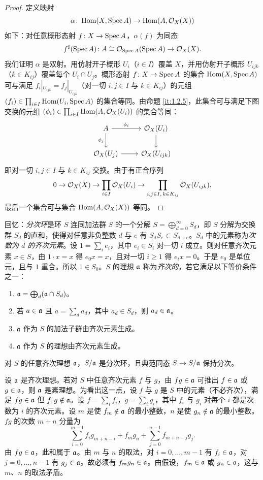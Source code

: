 \begin{proof}
定义映射
\[
\alpha\colon\operatorname{Hom}(X,\operatorname{Spec} A)\to\operatorname{Hom}(A,\mathcal{O}_X(X))
\]
如下：对任意概形态射 $f\colon X\to\operatorname{Spec} A$，$\alpha(f)$ 为同态
\[
f^\sharp(\operatorname{Spec} A)\colon A\cong\mathcal{O}_{\operatorname{Spec} A}(\operatorname{Spec} A)\to\mathcal{O}_X(X).
\]
我们证明 $\alpha$ 是双射。用仿射开子概形 $U_i$（$i\in I$）覆盖 $X$，并用仿射开子概形 $U_{ijk}$（$k\in K_{ij}$）覆盖每个 $U_i\cap U_j$。概形态射 $f\colon X\to\operatorname{Spec} A$ 的集合 $\operatorname{Hom}(X,\operatorname{Spec} A)$ 可与满足 $f_i|_{U_{ijk}}=f_j|_{U_{ijk}}$（对一切 $i,j\in I$ 与 $k\in K_{ij}$）的元组 $(f_i)\in\prod_{i\in I}\operatorname{Hom}(U_i,\operatorname{Spec} A)$ 的集合等同。由命题 \ref{it:1.2.5}，此集合可与满足下图交换的元组 $(\phi_i)\in\prod_{i\in I}\operatorname{Hom}(A,\mathcal{O}_X(U_i))$ 的集合等同：
\[
\begin{tikzcd}
A \arrow[r,"\phi_i"] \arrow[d,"\phi_j"'] & \cO_X(U_i) \arrow[d] \\
\cO_X(U_j) \arrow[r] & \cO_X(U_{ijk})
\end{tikzcd}
\]
即对一切 $i,j\in I$ 与 $k\in K_{ij}$ 交换。由于有正合序列
\[
0\to\mathcal{O}_X(X)\to\prod_{i\in I}\mathcal{O}_X(U_i)\to\prod_{i,j\in I,\,k\in K_{ij}}\mathcal{O}_X(U_{ijk}),
\]
最后一个集合可与集合 $\operatorname{Hom}(A,\mathcal{O}_X(X))$ 等同。
\end{proof}

回忆：\emph{分次环}是环 $S$ 连同加法群 $S$ 的一个分解 $S=\bigoplus_{d=0}^{\infty}S_d$，即 $S$ 分解为交换群 $S_d$ 的直和，使得对任意非负整数 $d$ 与 $e$ 有 $S_dS_e\subset S_{d+e}$。$S_d$ 中的元素称为\emph{次数为 $d$ 的齐次元素}。设 $1=\sum_ie_i$，其中 $e_i\in S_i$ 对一切 $i$ 成立。则对任意齐次元素 $x\in S$，由 $1\cdot x=x$ 得 $e_0x=x$，且对一切 $i\ge1$ 得 $e_ix=0$。于是 $e_0$ 是单位元，且与 $1$ 重合。所以 $1\in S_0$。$S$ 的理想 $\mathfrak{a}$ 称为\emph{齐次的}，若它满足以下等价条件之一：
\begin{enumerate}[label=(\roman*)]
  \item $\mathfrak{a}=\bigoplus_d(\mathfrak{a}\cap S_d)$。
  \item 若 $a\in\mathfrak{a}$ 且 $a=\sum_da_d$，其中 $a_d\in S_d$，则 $a_d\in\mathfrak{a}$。
  \item $\mathfrak{a}$ 作为 $S$ 的加法子群由齐次元素生成。
  \item $\mathfrak{a}$ 作为 $S$ 的理想由齐次元素生成。
\end{enumerate}

对 $S$ 的任意齐次理想 $\mathfrak{a}$，$S/\mathfrak{a}$ 是分次环，且典范同态 $S\to S/\mathfrak{a}$ 保持分次。

设 $\mathfrak{a}$ 是齐次理想。若对 $S$ 中任意齐次元素 $f$ 与 $g$，由 $fg\in\mathfrak{a}$ 可推出 $f\in\mathfrak{a}$ 或 $g\in\mathfrak{a}$，则 $\mathfrak{a}$ 是素理想。为看出这一点，设 $f$ 与 $g$ 是 $S$ 中的元素（不必齐次），满足 $fg\in\mathfrak{a}$ 但 $f,g\notin\mathfrak{a}$。设 $f=\sum_if_i$，$g=\sum_ig_i$，其中 $f_i$ 与 $g_i$ 对每个 $i$ 都是次数为 $i$ 的齐次元素。设 $m$ 是使 $f_m\notin\mathfrak{a}$ 的最小整数，$n$ 是使 $g_n\notin\mathfrak{a}$ 的最小整数。$fg$ 的次数 $m+n$ 分量为
\[
\sum_{i=0}^{m-1}f_ig_{m+n-i}+f_mg_n+\sum_{j=0}^{n-1}f_{m+n-j}g_j.
\]
由 $fg\in\mathfrak{a}$，此和属于 $\mathfrak{a}$。由 $m$ 与 $n$ 的取法，对 $i=0,\dots,m-1$ 有 $f_i\in\mathfrak{a}$，对 $j=0,\dots,n-1$ 有 $g_j\in\mathfrak{a}$。故必须有 $f_mg_n\in\mathfrak{a}$。由假设，$f_m\in\mathfrak{a}$ 或 $g_n\in\mathfrak{a}$，这与 $m$、$n$ 的取法矛盾。

